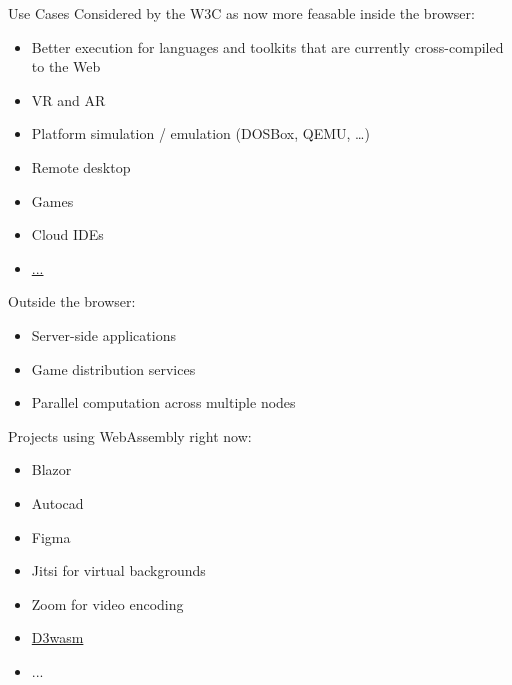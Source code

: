 \documentclass{beamer}
\begin{document}
\begin{frame}{Use Cases}
    Considered by the W3C as now more feasable inside the browser:
    \begin{itemize}
        \item Better execution for languages and toolkits that are currently cross-compiled to the Web
        \item VR and AR
        \item Platform simulation / emulation (DOSBox, QEMU, …)
        \item Remote desktop
        \item Games
        \item Cloud IDEs
        \item \href{https://webassembly.org/docs/use-cases/}{...}
    \end{itemize}
    Outside the browser:
    \begin{itemize}
        \item Server-side applications
        \item Game distribution services
        \item Parallel computation across multiple nodes
    \end{itemize}
\end{frame}

\begin{frame}
    Projects using WebAssembly right now:
    \begin{itemize}
        \item Blazor
        \item Autocad
        \item Figma
        \item Jitsi for virtual backgrounds
        \item Zoom for video encoding
        \item \href{https://wasm.continuation-labs.com/d3demo/}{D3wasm}
        \item ...
    \end{itemize}
\end{frame}
\end{document}
